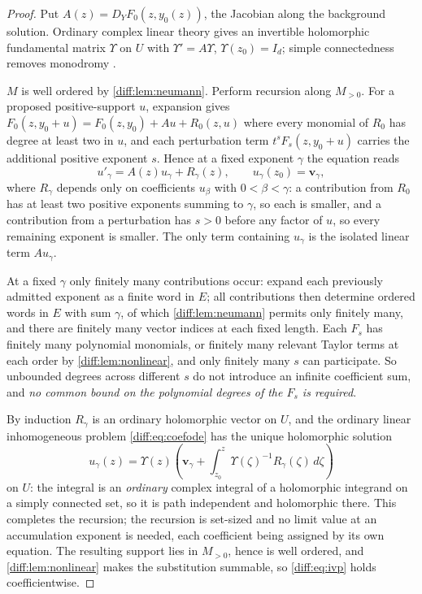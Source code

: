 \documentclass[11pt,letterpaper]{article}
\numberwithin{equation}{section}
\theoremstyle{definition}
\theoremstyle{remark}
\begin{document}
\begin{proof}
Put $A(z)=D_{Y}F_{0}(z,y_{0}(z))$, the Jacobian along the background solution.
Ordinary complex linear theory gives an invertible holomorphic fundamental
matrix $\Upsilon$ on $U$ with $\Upsilon'=A\Upsilon$, $\Upsilon(z_{0})=I_{d}$; simple
connectedness removes monodromy \cite[Ch.\ 3--4]{Teschl}.

$M$ is well ordered by \cref{diff:lem:neumann}. Perform recursion along
$M_{>0}$. For a proposed positive-support $u$, expansion gives
$F_{0}(z,y_{0}+u)=F_{0}(z,y_{0})+Au+R_{0}(z,u)$ where every monomial of
$R_{0}$ has degree at least two in $u$, and each perturbation term
$t^{s}F_{s}(z,y_{0}+u)$ carries the additional positive exponent $s$. Hence at
a fixed exponent $\gamma$ the equation reads
\begin{equation}\label{diff:eq:coefode}
 u'_{\gamma}=A(z)u_{\gamma}+R_{\gamma}(z),
 \qquad u_{\gamma}(z_{0})=\mathbf{v}_{\gamma},
\end{equation}
where $R_{\gamma}$ depends only on coefficients $u_{\beta}$ with
$0<\beta<\gamma$: a contribution from $R_{0}$ has at least two positive
exponents summing to $\gamma$, so each is smaller, and a contribution from a
perturbation has $s>0$ before any factor of $u$, so every remaining exponent is
smaller. The only term containing $u_{\gamma}$ is the isolated linear term
$Au_{\gamma}$.

At a fixed $\gamma$ only finitely many contributions occur: expand each
previously admitted exponent as a finite word in $E$; all contributions then
determine ordered words in $E$ with sum $\gamma$, of which
\cref{diff:lem:neumann} permits only finitely many, and there are finitely many
vector indices at each fixed length. Each $F_{s}$ has finitely many polynomial
monomials, or finitely many relevant Taylor terms at each order by
\cref{diff:lem:nonlinear}, and only finitely many $s$ can participate. So
unbounded degrees across different $s$ do not introduce an infinite
coefficient sum, and \emph{no common bound on the polynomial degrees of the
$F_{s}$ is required}.

By induction $R_{\gamma}$ is an ordinary holomorphic vector on $U$, and the
ordinary linear inhomogeneous problem \cref{diff:eq:coefode} has the unique
holomorphic solution
\begin{equation}\label{diff:eq:coefsolution}
 u_{\gamma}(z)=\Upsilon(z)
 \left(\mathbf{v}_{\gamma}+\int_{z_{0}}^{z}\Upsilon(\zeta)^{-1}R_{\gamma}(\zeta)\,
 d\zeta\right)
\end{equation}
on $U$: the integral is an \emph{ordinary} complex integral of a holomorphic
integrand on a simply connected set, so it is path independent and holomorphic
there. This completes the recursion; the recursion is set-sized and no limit
value at an accumulation exponent is needed, each coefficient being assigned
by its own equation. The resulting support lies in $M_{>0}$, hence is well
ordered, and \cref{diff:lem:nonlinear} makes the substitution summable, so
\cref{diff:eq:ivp} holds coefficientwise.


\end{proof}
\end{document}
